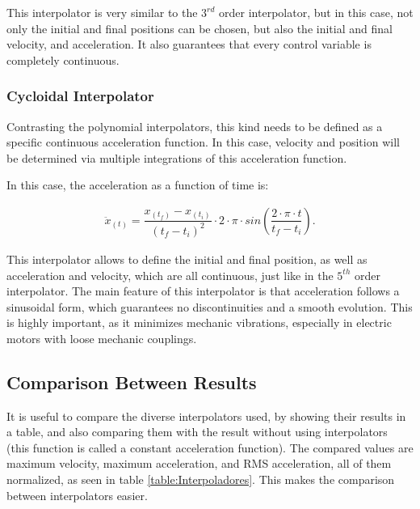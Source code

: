 \documentclass[a4paper]{aadeca}
\begin{document}
This interpolator is very similar to the $3^{rd}$ order interpolator, but in this case, not only the initial and final positions can be chosen, but also the initial and final velocity, and acceleration.
It also guarantees that every control variable is completely continuous.

\subsubsection{\textbf{Cycloidal Interpolator}}

Contrasting the polynomial interpolators, this kind needs to be defined as a specific continuous acceleration function.
In this case, velocity and position will be determined via multiple integrations of this acceleration function.

In this case, the acceleration as a function of time is:

\begin{align}
\ddot{x}_{(t)} = \dfrac{ x_{(t_f)} - x_{(t_i)} }{ {(t_f - t_i)}^{2} } \cdot 2 \cdot \pi \cdot sin( \dfrac{ 2 \cdot \pi \cdot t }{ t_f - t_i } ).
\end{align}

This interpolator allows to define the initial and final position, as well as acceleration and velocity, which are all continuous, just like in the $5^{th}$ order interpolator.
The main feature of this interpolator is that acceleration follows a sinusoidal form, which guarantees no discontinuities and a smooth evolution.
This is highly important, as it minimizes mechanic vibrations, especially in electric motors with loose mechanic couplings.


\subsection{Comparison Between Results}

It is useful to compare the diverse interpolators used, by showing their results in a table, and also comparing them with the result without using interpolators (this function is called a constant acceleration function).
The compared values are maximum velocity, maximum acceleration, and RMS acceleration, all of them normalized, as seen in table \ref{table:Interpoladores}.
This makes the comparison between interpolators easier.
\end{document}
